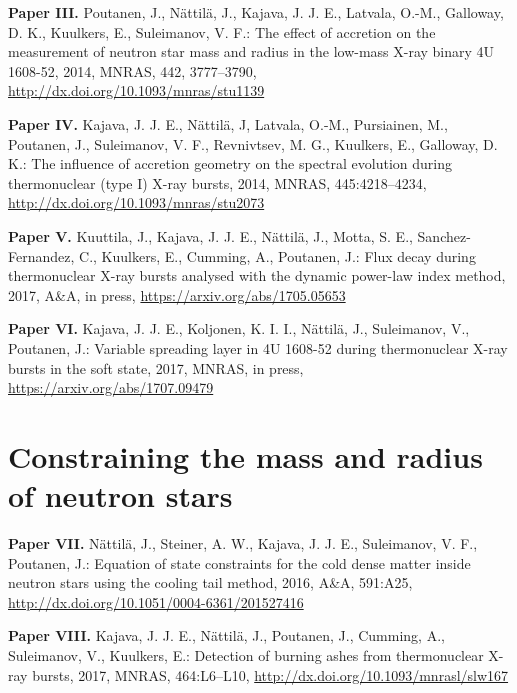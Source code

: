 \hspace{15pt}\textbf{Paper III.} Poutanen, J., Nättilä, J., Kajava, J. J. E., Latvala, O.-M., Galloway, D. K., Kuulkers, E., Suleimanov, V. F.: The effect of accretion on the measurement of neutron star mass and radius in the low-mass X-ray binary 4U 1608-52, 2014, MNRAS, 442, 3777–3790, \url{http://dx.doi.org/10.1093/mnras/stu1139}

\vspace{0.3cm}
\textbf{Paper IV.} Kajava, J. J. E., Nättilä, J, Latvala, O.-M., Pursiainen, M., Poutanen, J., Suleimanov, V. F., Revnivtsev, M. G., Kuulkers, E., Galloway, D. K.: The influence of accretion geometry on the spectral evolution during thermonuclear (type I) X-ray bursts, 2014, MNRAS, 445:4218–4234, \url{http://dx.doi.org/10.1093/mnras/stu2073}


\vspace{0.3cm}
\textbf{Paper V.} Kuuttila, J., Kajava, J. J. E., Nättilä, J., Motta, S. E., Sanchez-Fernandez, C., Kuulkers, E., Cumming, A., Poutanen, J.: Flux decay during thermonuclear X-ray bursts analysed with the dynamic power-law index method, 2017, A\&A, in press, \url{https://arxiv.org/abs/1705.05653}
 

\vspace{0.3cm}
\textbf{Paper VI.} Kajava, J. J. E., Koljonen, K. I. I., Nättilä, J., Suleimanov, V., Poutanen, J.: Variable spreading layer in 4U 1608-52 during thermonuclear X-ray bursts in the soft state, 2017, MNRAS, in press, \url{https://arxiv.org/abs/1707.09479}


\vspace{0.3cm}
\section*{Constraining the mass and radius of neutron stars}

\hspace{15pt}\textbf{Paper VII.} Nättilä, J., Steiner, A. W., Kajava, J. J. E., Suleimanov, V. F., Poutanen, J.: Equation of state constraints for the cold dense matter inside neutron stars using the cooling tail method, 2016, A\&A, 591:A25, \url{http://dx.doi.org/10.1051/0004-6361/201527416}
 
\vspace{0.3cm}
\textbf{Paper VIII.} Kajava, J. J. E., Nättilä, J., Poutanen, J., Cumming, A., Suleimanov, V., Kuulkers, E.: Detection of burning ashes from thermonuclear X-ray bursts, 2017, MNRAS, 464:L6–L10, \url{http://dx.doi.org/10.1093/mnrasl/slw167}
 

